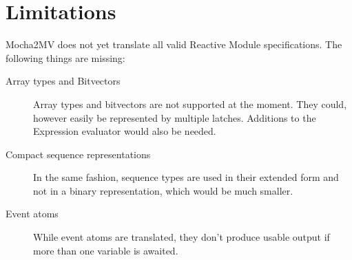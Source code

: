 \documentclass[a4paper,12pt]{article}
\begin{document}
\section{Limitations}
Mocha2MV does not yet translate all valid Reactive Module specifications. The
following things are missing:

\begin{description}
\item[Array types and Bitvectors] Array types and bitvectors are not supported at the moment. They could,
however easily be represented by multiple latches. Additions to the Expression
evaluator would also be needed.
\item[Compact sequence representations] In the same fashion, sequence types are used
in their extended form and not in a binary representation, which would be
much smaller.
\item[Event atoms] While event atoms are translated, they don't produce usable output if more than one variable is awaited.
\end{description}
\end{document}
